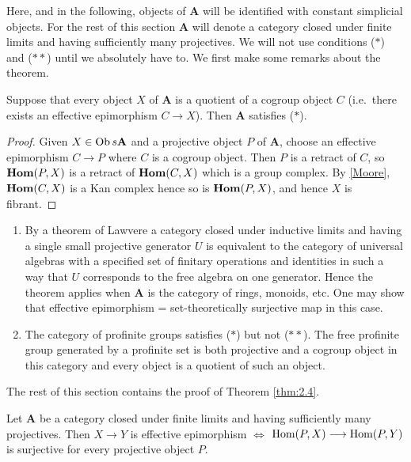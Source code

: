 \documentclass[../main]{subfiles}
\begin{document}
Here, and in the following, objects of $\mathbf{A}$ will be identified with constant simplicial objects. For the rest of this section $\mathbf{A}$ will denote a category closed under finite limits and having sufficiently many projectives. We will not use conditions ($\ast$) and ($\ast\ast$) until we absolutely have to. We first make some remarks about the theorem. 

\begin{proposition}
\label{prop:2.4.01}
Suppose that every object $X$ of $\mathbf{A}$ is a quotient of a cogroup object $C$ (i.e.\ there exists an effective epimorphism $C \longrightarrow X$). Then $\mathbf{A}$ satisfies ($\ast$).
\end{proposition}

\begin{proof}
Given $X \in \operatorname{Ob} s\mathbf{A}$ and a projective object $P$ of $\mathbf{A}$, choose an effective epimorphism $C \longrightarrow P$ where $C$ is a cogroup object. Then $P$ is a retract of $C$, so $\operatorname{\mathbf{Hom}}(P, X)$ is a retract of $\operatorname{\mathbf{Hom}}(C, X)$ which is a group complex. By \ref{Moore}, $\operatorname{\mathbf{Hom}}(C, X)$ is a Kan complex hence so is $\operatorname{\mathbf{Hom}}(P, X)$, and hence $X$ is fibrant. 
\end{proof}

\begin{remarks*}
\begin{enumerate}
    \item By a theorem of Lawvere \cite{lawvere_functorial_1963} a category closed under inductive limits and having a single small projective generator $U$ is equivalent to the category of universal algebras with a specified set of finitary operations and identities in such a way that $U$ corresponds to the free algebra on one generator. Hence the theorem applies when $\mathbf{A}$ is the category of rings, monoids, etc. One may show that effective epimorphism = set-theoretically surjective map in this case. 
    
    \item The category of profinite groups satisfies ($\ast$) but not  ($\ast\ast$). The free profinite group generated by a profinite set is both projective and a cogroup object in this category and every object is a quotient of such an object. 
\end{enumerate}
\end{remarks*}

The rest of this section contains the proof of Theorem \ref{thm:2.4}.

\begin{proposition}
\label{prop:2.4.02}
Let $\mathbf{A}$ be a category closed under finite limits and having sufficiently many projectives. Then $X \longrightarrow Y$ is effective epimorphism $\iff$ $\operatorname{Hom}(P, X) \longrightarrow \operatorname{Hom}(P, Y)$ is surjective for every projective object $P$. 
\end{proposition}
\end{document}
